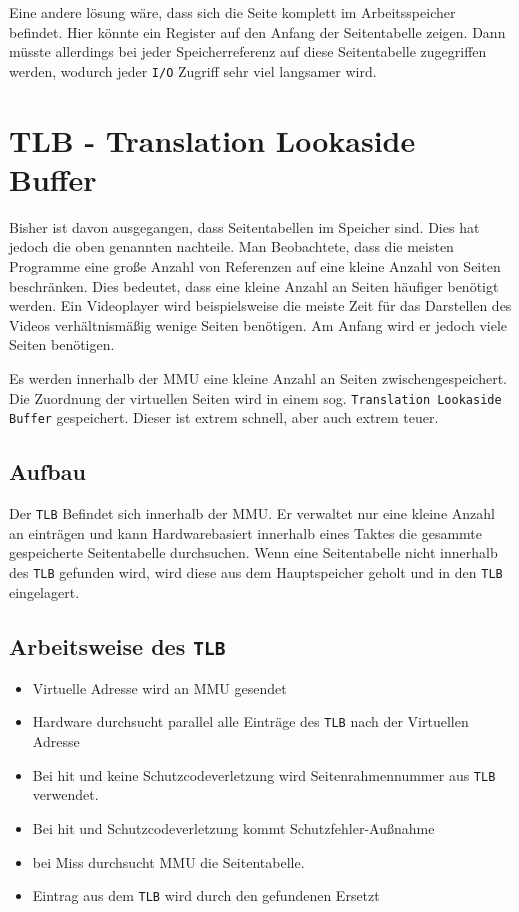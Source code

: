 Eine andere lösung wäre, dass sich die Seite komplett im Arbeitsspeicher befindet. Hier könnte ein Register auf den Anfang der Seitentabelle zeigen. Dann müsste allerdings bei jeder Speicherreferenz auf diese Seitentabelle zugegriffen werden, wodurch jeder \texttt{I/O} Zugriff sehr viel langsamer wird.

\section{TLB - Translation Lookaside Buffer}

Bisher ist davon ausgegangen, dass Seitentabellen im Speicher sind. Dies hat jedoch die oben genannten nachteile. Man Beobachtete, dass die meisten Programme eine große Anzahl von Referenzen auf eine kleine Anzahl von Seiten beschränken. Dies bedeutet, dass eine kleine Anzahl an Seiten häufiger benötigt werden. Ein Videoplayer wird beispielsweise die meiste Zeit für das Darstellen des Videos verhältnismäßig wenige Seiten benötigen. Am Anfang wird er jedoch viele Seiten benötigen. 

Es werden innerhalb der MMU eine kleine Anzahl an Seiten zwischengespeichert. Die Zuordnung der virtuellen Seiten wird in einem sog. \texttt{Translation Lookaside Buffer} gespeichert. Dieser ist extrem schnell, aber auch extrem teuer.

\subsection{Aufbau}

Der \texttt{TLB} Befindet sich innerhalb der MMU. Er verwaltet nur eine kleine Anzahl an einträgen und kann Hardwarebasiert innerhalb eines Taktes die gesammte gespeicherte Seitentabelle durchsuchen. Wenn eine Seitentabelle nicht innerhalb des \texttt{TLB} gefunden wird, wird diese aus dem Hauptspeicher geholt und in den \texttt{TLB} eingelagert.

\subsection{Arbeitsweise des \texttt{TLB}}

\begin{itemize}
    \item Virtuelle Adresse wird an MMU gesendet
    \item Hardware durchsucht parallel alle Einträge des \texttt{TLB} nach der Virtuellen Adresse
    \item Bei hit und keine Schutzcodeverletzung wird Seitenrahmennummer aus \texttt{TLB} verwendet.
    \item Bei hit und Schutzcodeverletzung kommt Schutzfehler-Außnahme
    \item bei Miss durchsucht MMU die Seitentabelle.
    \item Eintrag aus dem \texttt{TLB} wird durch den gefundenen Ersetzt
\end{itemize}

